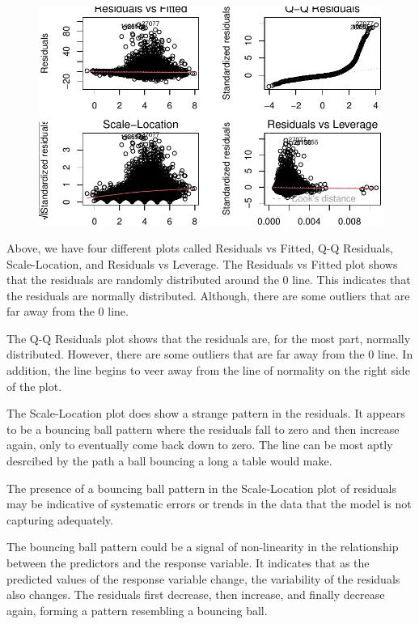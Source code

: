 \documentclass[
  super,
  preprint,
  3p]{elsarticle}
\begin{document}
\begin{figure}[H]

{\centering \includegraphics{project_report_files/figure-pdf/unnamed-chunk-8-1.pdf}

}

\end{figure}

Above, we have four different plots called Residuals vs Fitted, Q-Q
Residuals, Scale-Location, and Residuals vs Leverage. The Residuals vs
Fitted plot shows that the residuals are randomly distributed around the
0 line. This indicates that the residuals are normally distributed.
Although, there are some outliers that are far away from the 0 line.

The Q-Q Residuals plot shows that the residuals are, for the most part,
normally distributed. However, there are some outliers that are far away
from the 0 line. In addition, the line begins to veer away from the line
of normality on the right side of the plot.

The Scale-Location plot does show a strange pattern in the residuals. It
appears to be a bouncing ball pattern where the residuals fall to zero
and then increase again, only to eventually come back down to zero. The
line can be most aptly desrcibed by the path a ball bouncing a long a
table would make.

The presence of a bouncing ball pattern in the Scale-Location plot of
residuals may be indicative of systematic errors or trends in the data
that the model is not capturing adequately.

The bouncing ball pattern could be a signal of non-linearity in the
relationship between the predictors and the response variable. It
indicates that as the predicted values of the response variable change,
the variability of the residuals also changes. The residuals first
decrease, then increase, and finally decrease again, forming a pattern
resembling a bouncing ball.
\end{document}
